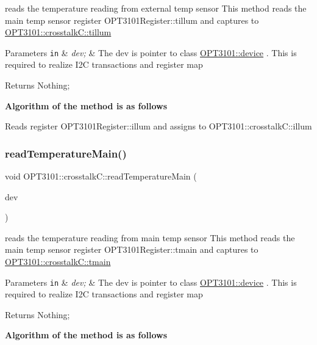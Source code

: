 reads the temperature reading from external temp sensor This method reads the main temp sensor register O\+P\+T3101\+Register\+::tillum and captures to \mbox{\hyperlink{class_o_p_t3101_1_1crosstalk_c_ab1d1d581f0495f5695ad49a2a8a41fd3}{O\+P\+T3101\+::crosstalk\+C\+::tillum}} 


\begin{DoxyParams}[1]{Parameters}
\mbox{\tt in}  & {\em dev;} & The dev is pointer to class \mbox{\hyperlink{class_o_p_t3101_1_1device}{O\+P\+T3101\+::device}} . This is required to realize I2C transactions and register map \\
\hline
\end{DoxyParams}
\begin{DoxyReturn}{Returns}
Nothing; 
\end{DoxyReturn}
{\bfseries Algorithm of the method is as follows}


\begin{DoxyItemize}
\item Reads register O\+P\+T3101\+Register\+::illum and assigns to O\+P\+T3101\+::crosstalk\+C\+::illum 
\end{DoxyItemize}\mbox{\label{class_o_p_t3101_1_1crosstalk_c_a44bdf91acac0c969a89507ab2139e3b6}} 
\subsubsection{\texorpdfstring{read\+Temperature\+Main()}{readTemperatureMain()}}
{\footnotesize\ttfamily void O\+P\+T3101\+::crosstalk\+C\+::read\+Temperature\+Main (\begin{DoxyParamCaption}\item[{\mbox{\hyperlink{class_o_p_t3101_1_1device}{O\+P\+T3101\+::device}} $\ast$}]{dev }\end{DoxyParamCaption})}



reads the temperature reading from main temp sensor This method reads the main temp sensor register O\+P\+T3101\+Register\+::tmain and captures to \mbox{\hyperlink{class_o_p_t3101_1_1crosstalk_c_a8b7250b531e953587c665c2c43860d82}{O\+P\+T3101\+::crosstalk\+C\+::tmain}} 


\begin{DoxyParams}[1]{Parameters}
\mbox{\tt in}  & {\em dev;} & The dev is pointer to class \mbox{\hyperlink{class_o_p_t3101_1_1device}{O\+P\+T3101\+::device}} . This is required to realize I2C transactions and register map \\
\hline
\end{DoxyParams}
\begin{DoxyReturn}{Returns}
Nothing; 
\end{DoxyReturn}
{\bfseries Algorithm of the method is as follows}



